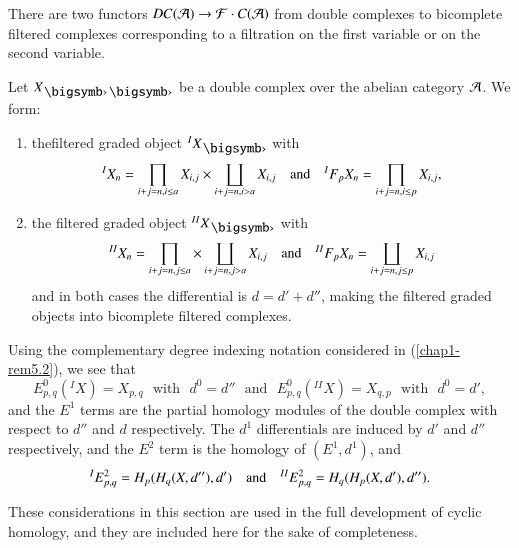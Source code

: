 There are two functors $DC(\mathcal{A})\to \mathcal{F}\cdot C(\mathcal{A})$ from double complexes
to bicomplete filtered complexes corresponding to a filtration on the
first variable or on the second variable.

\begin{definition}\label{chap1-defi6.4}
Let $X_{\bigdot\bigdot}$ be a double complex over the abelian category
$\mathcal{A}$. We form:
\begin{enumerate}
\renewcommand{\labelenumi}{(\theenumi)}
\item the\pageoriginale filtered graded object ${}^{I}X_{\bigdot}$
  with
$$
{}^{I}X_{n}=\prod\limits_{i+j=n,i\leq
  a}X_{i,j}\times\coprod\limits_{i+j=n,i>a}X_{i,j}\quad\text{and}\quad
{}^{I}F_{p}X_{n}=\prod\limits_{i+j=n,i\leq p}X_{i,j},
$$

\item the filtered graded object ${}^{II}X_{\bigdot}$ with
$$
{}^{II}X_{n}=\prod\limits_{i+j=n,j\leq
  a}\times\coprod\limits_{i+j=n,j>a}X_{i,j}\quad\text{and}\quad
{}^{II}F_{p}X_{n}=\coprod\limits_{i+j=n,j\leq p}X_{i,j}
$$
and in both cases the differential is $d=d'+d''$, making the filtered
graded objects into bicomplete filtered complexes.
\end{enumerate}
\end{definition}

\begin{remark}\label{chap1-rem6.5}
Using the complementary degree indexing notation considered in
(\ref{chap1-rem5.2}), we see that
$$
E^{0}_{p,q}({}^{I}X)=X_{p,q}\text{~ with~ } d^{0}=d''\text{~ and~ }
E^{0}_{p,q}({}^{II}X)=X_{q,p}\text{~ with~ } d^{0}=d',
$$
and the $E^{1}$ terms are the partial homology modules of the double
complex with respect to $d''$ and $d$ respectively. The $d^{1}$
differentials are induced by $d'$ and $d''$ respectively, and the
$E^{2}$ term is the homology of $(E^{1},d^{1})$, and 
$$
{}^{I}E^{2}_{p,q}=H_{p}(H_{q}(X,d''),d')\quad\text{and}\quad
{}^{II}E^{2}_{p,q}=H_{q}(H_{p}(X,d'),d''). 
$$

These considerations in this section are used in the full development
of cyclic homology, and they are included here for the sake of
completeness. 
\end{remark}


